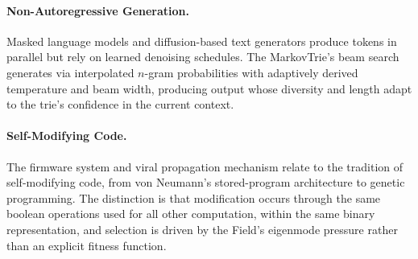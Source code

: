 \paragraph{Non-Autoregressive Generation.}
Masked language models and diffusion-based text generators produce
tokens in parallel but rely on learned denoising schedules.  The
MarkovTrie's beam search generates via interpolated $n$-gram
probabilities with adaptively derived temperature and beam width,
producing output whose diversity and length adapt to the trie's
confidence in the current context.

\paragraph{Self-Modifying Code.}
The firmware system and viral propagation mechanism relate to the
tradition of self-modifying code, from von Neumann's stored-program
architecture to genetic programming.  The distinction is that
modification occurs through the same boolean operations used for all
other computation, within the same binary representation, and
selection is driven by the Field's eigenmode pressure rather than an
explicit fitness function.
